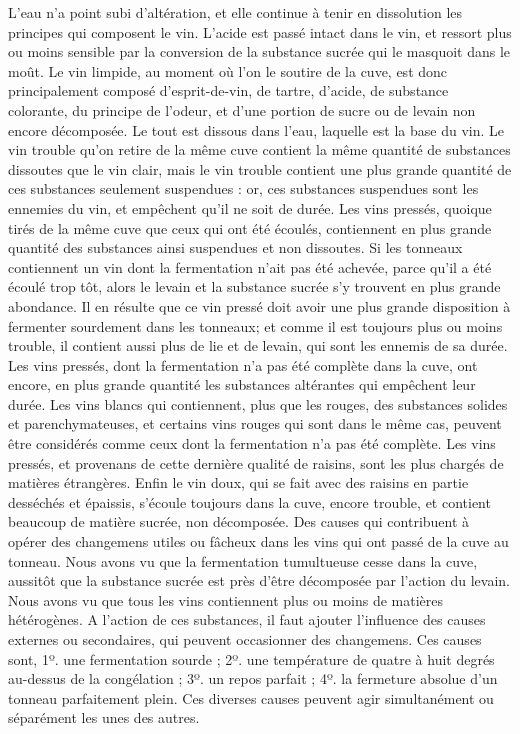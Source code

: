 L'eau n'a point subi d'altération, et elle\setcounter{page}{317} continue à tenir en dissolution les principes qui composent le vin. L'acide est passé intact dans le vin, et ressort plus ou moins sensible par la conversion de la substance sucrée qui le masquoit dans le moût. Le vin limpide, au moment où l'on le soutire de la cuve, est donc principalement composé d'esprit-de-vin, de tartre, d'acide, de substance colorante, du principe de l'odeur, et d'une portion de sucre ou de levain non encore décomposée. Le tout est dissous dans l'eau, laquelle est la base du vin. Le vin trouble qu'on retire de la même cuve contient la même quantité de substances dissoutes que le vin clair, mais le vin trouble contient une plus grande quantité de ces substances seulement suspendues : or, ces substances suspendues sont les ennemies du vin, et empêchent qu'il ne soit de durée. Les vins pressés, quoique tirés de la même cuve que ceux qui ont été écoulés, contiennent en plus grande quantité des substances ainsi suspendues et non dissoutes. Si les tonneaux contiennent un vin dont la fermentation n'ait pas été achevée, parce qu'il a été écoulé trop tôt, alors le levain et la substance sucrée s'y trouvent en plus grande abondance. Il en résulte que ce vin pressé doit avoir une plus grande disposition\setcounter{page}{318} à fermenter sourdement dans les tonneaux; et comme il est toujours plus ou moins trouble, il contient aussi plus de lie et de levain, qui sont les ennemis de sa durée.
Les vins pressés, dont la fermentation n'a pas été complète dans la cuve, ont encore, en plus grande quantité les substances altérantes qui empêchent leur durée.
Les vins blancs qui contiennent, plus que les rouges, des substances solides et parenchymateuses, et certains vins rouges qui sont dans le même cas, peuvent être considérés comme ceux dont la fermentation n'a pas été complète. Les vins pressés, et provenans de cette dernière qualité de raisins, sont les plus chargés de matières étrangères.
Enfin le vin doux, qui se fait avec des raisins en partie desséchés et épaissis, s'écoule toujours dans la cuve, encore trouble, et contient beaucoup de matière sucrée, non décomposée.
Des causes qui contribuent à opérer des changemens utiles ou fâcheux dans les vins qui ont passé de la cuve au tonneau.
Nous avons vu que la fermentation tumultueuse cesse dans la cuve, aussitôt que la substance sucrée est près d'être décomposée par l'action du levain. Nous avons vu que tous les vins contiennent plus ou moins\setcounter{page}{319} de matières hétérogènes. A l'action de ces substances, il faut ajouter l'influence des causes externes ou secondaires, qui peuvent occasionner des changemens. Ces causes sont, 1º. une fermentation sourde ; 2º. une température de quatre à huit degrés au-dessus de la congélation ; 3º. un repos parfait ; 4º. la fermeture absolue d'un tonneau parfaitement plein. Ces diverses causes peuvent agir simultanément ou séparément les unes des autres.
